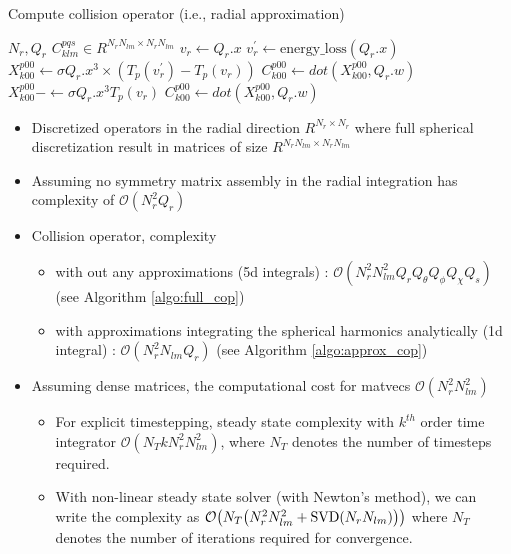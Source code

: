 \documentclass{article}[draft]
\begin{document}
\begin{algorithm}
	\caption{Compute collision operator (i.e., radial approximation) \label{algo:approx_cop}}
	\begin{algorithmic}
		\Require $N_r, Q_r$
		\Ensure $C^{pqs}_{klm} \in R^{N_rN_{lm} \times N_rN_{lm}}$ 
		\State $v_r \leftarrow Q_r.x$
		\State $v^\prime_r \leftarrow \text{energy\_loss}(Q_r.x)$
			\State $X^{p00}_{k00} \leftarrow \sigma Q_r.x^3 \times (T_{p}({v^\prime_r})  - T_{p}({v_r}))$
			\State $C^{p00}_{k00} \leftarrow dot(X^{p00}_{k00},Q_r.w)$
		\EndFor
		\EndFor
			\State $X^{p00}_{k00} -\leftarrow \sigma Q_r.x^3 T_{p}({v_r})$
			\State $C^{p00}_{k00} \leftarrow dot(X^{p00}_{k00},Q_r.w)$
		\EndFor
		\EndFor
	\end{algorithmic}
\end{algorithm}


\begin{itemize}
	\item Discretized operators in the radial direction $R^{N_r \times N_r}$ where full spherical discretization result in matrices of size $R^{N_r N_{lm} \times N_r N_{lm}}$
	\item Assuming no symmetry matrix assembly in the radial integration has complexity of $\mathcal{O}(N_r ^2  Q_r)$
	\item Collision operator, complexity 
	\begin{itemize}
		\item with out any approximations (5d integrals) : $\mathcal{O} (N_r^2 N_{lm}^2 Q_r Q_{\theta} Q_{\phi} Q_{\chi} Q_{s})$ (see Algorithm \ref{algo:full_cop})
		\item with approximations integrating the spherical harmonics analytically (1d integral) : $\mathcal{O} (N_r^2 N_{lm} Q_r)$ (see Algorithm \ref{algo:approx_cop})
	\end{itemize}
	\item Assuming dense matrices, the computational cost for matvecs $\mathcal{O}(N_r^2 N_{lm}^2)$
	\begin{itemize}
		\item For explicit timestepping, steady state complexity with $k^{th}$ order time integrator $\mathcal{O}(N_T k N_r^2 N_{lm}^2)$, where $N_T$ denotes the number of timesteps required. 
		\item With non-linear steady state solver (with Newton's method), we can write the complexity as $\mathcal{O}\of{N_T \of{N_r^2 N_{lm}^2 + \text{SVD}(N_rN_{lm})} }$ where $N_T$ denotes the number of iterations required for convergence. 
	\end{itemize}
\end{itemize}
\end{document}

